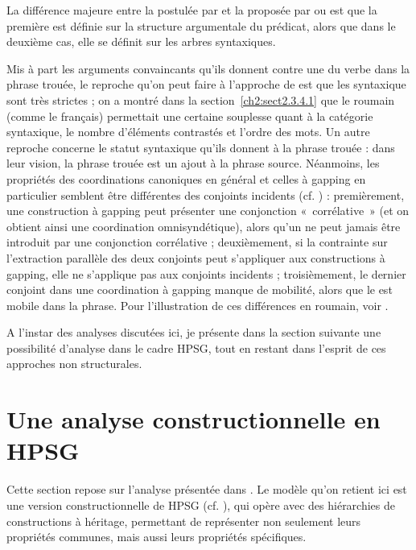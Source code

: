 La différence majeure entre la  postulée par \citet{CulicoverEtAl2005} et la  proposée par \citet{SagEtAl1985} ou \citet{Gardent1991} est que la première est définie sur la structure argumentale du prédicat, alors que dans le deuxième cas, elle se définit sur les arbres syntaxiques. 

Mis à part les arguments convaincants qu’ils donnent contre une  du verbe dans la phrase trouée, le reproche qu’on peut faire à l’approche de \citet{CulicoverEtAl2005} est que les  syntaxique sont très strictes ; on a montré dans la section~\ref{ch2:sect2.3.4.1} que le roumain (comme le français) permettait une certaine souplesse quant à la catégorie syntaxique, le nombre d’éléments contrastés et l’ordre des mots. Un autre reproche concerne le statut syntaxique qu’ils donnent à la phrase trouée : dans leur vision, la phrase trouée est un ajout à la phrase source. Néanmoins, les propriétés des coordinations canoniques en général et celles à gapping en particulier semblent être différentes des conjoints incidents (cf. \citealt{Abeille2005}) : premièrement, une construction à gapping peut présenter une conjonction «~corrélative~» (et on obtient ainsi une coordination omnisyndétique), alors qu’un  ne peut jamais être introduit par une conjonction corrélative ; deuxièmement, si la contrainte sur l’extraction parallèle des deux conjoints peut s’appliquer aux constructions à gapping, elle ne s’applique pas aux conjoints incidents ; troisièmement, le dernier conjoint dans une coordination à gapping manque de mobilité, alors que le  est mobile dans la phrase. Pour l’illustration de ces différences en roumain, voir \citet{Bilbiie2008}. 

A l’instar des analyses discutées ici, je présente dans la section suivante une possibilité d’analyse dans le cadre HPSG, tout en restant dans l’esprit de ces approches non structurales.


\section{Une analyse constructionnelle en HPSG} \label{ch2:sect2.5}

Cette section repose sur l’analyse présentée dans \citet{AbeilleEtAl2014}. Le modèle qu’on retient ici est une version constructionnelle de HPSG (cf. \citealt{Sag1997,GinzburgEtAl2000,SagEtAl2003,Sag2012}), qui opère avec des hiérarchies de constructions à héritage, permettant de représenter non seulement leurs propriétés communes, mais aussi leurs propriétés spécifiques. 

